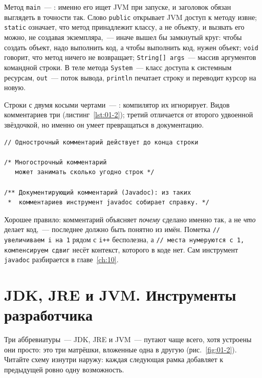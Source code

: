 Метод \texttt{main}~--- : именно его ищет JVM при запуске, и
заголовок обязан выглядеть в точности так. Слово \texttt{public} открывает JVM
доступ к методу извне; \texttt{static} означает, что метод принадлежит классу, а
не объекту, и вызвать его можно, не создавая экземпляра,~--- иначе вышел бы
замкнутый круг: чтобы создать объект, надо выполнить код, а чтобы выполнить код,
нужен объект; \texttt{void} говорит, что метод ничего не возвращает;
\texttt{String[] args}~--- массив аргументов командной строки. В теле метода
\texttt{System}~--- класс доступа к системным ресурсам, \texttt{out}~--- поток
вывода, \texttt{println} печатает строку и переводит курсор на новую.

Строки с двумя косыми чертами~--- : компилятор их игнорирует.
Видов комментариев три (листинг~\ref{lst:01-2}); третий отличается от второго
удвоенной звёздочкой, но именно он умеет превращаться в документацию.

\begin{listing}[H]
\begin{verbatim}
// Однострочный комментарий действует до конца строки

/* Многострочный комментарий
   может занимать сколько угодно строк */

/** Документирующий комментарий (Javadoc): из таких
 *  комментариев инструмент javadoc собирает справку. */
\end{verbatim}
\caption{Три вида комментариев}
\label{lst:01-2}
\end{listing}

Хорошее правило: комментарий объясняет \emph{почему} сделано именно так, а не
\emph{что} делает код,~--- последнее должно быть понятно из имён. Пометка
\texttt{// увеличиваем i на 1} рядом с \texttt{i++} бесполезна, а
\texttt{// места нумеруются с~1, компенсируем сдвиг} несёт контекст, которого в
коде нет. Сам инструмент \texttt{javadoc} разбирается в главе~\ref{ch:10}.

\section{JDK, JRE и JVM. Инструменты разработчика}

Три аббревиатуры~--- JDK, JRE и JVM~--- путают чаще всего, хотя устроены они
просто: это три матрёшки, вложенные одна в другую (рис.~\ref{fig:01-2}).
Читайте схему изнутри наружу: каждая следующая рамка добавляет к предыдущей
ровно одну возможность.

